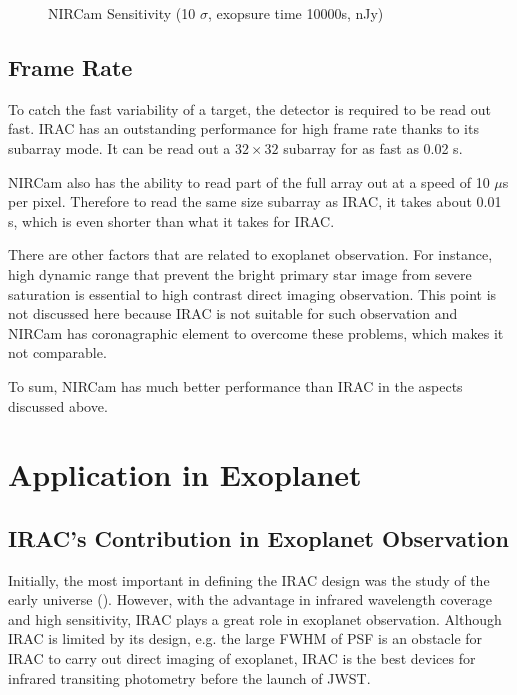 \documentclass[preprint, 12pt]{aastex} \synctex=1
\begin{document}
\begin{figure} \centering {}
  \caption{NIRCam Sensitivity (10 $\sigma$, exopsure time 10000s,
nJy)}
  \label{fig:nircam-sen}
\end{figure}

\subsection{Frame Rate} To catch the fast variability of a target, the
detector is required to be read out fast. IRAC has an outstanding
performance for high frame rate thanks to its subarray mode. It can be
read out a $32 \times 32$ subarray for as fast as 0.02 s.

NIRCam also has the ability to read part of the full array out at a
speed of 10 $\mu$s per pixel. Therefore to read the same size subarray
as IRAC, it takes about 0.01 s, which is even shorter than what it
takes for IRAC.

There are other factors that are related to exoplanet observation. For
instance, high dynamic range that prevent the bright primary star
image from severe saturation is essential to high contrast direct
imaging observation. This point is not discussed here because IRAC is
not suitable for such observation and NIRCam has coronagraphic element
to overcome these problems, which makes it not comparable.

To sum, NIRCam has much better performance than IRAC in the aspects
discussed above.

\section{Application in Exoplanet}
\subsection{IRAC's Contribution in Exoplanet Observation} Initially,
the most important in defining the IRAC design was the study of the
early universe (\citep{2004ApJS..154...10F}). However, with the
advantage in infrared wavelength coverage and high sensitivity, IRAC
plays a great role in exoplanet observation. Although IRAC is limited
by its design, e.g. the large FWHM of PSF is an obstacle for IRAC to
carry out direct imaging of exoplanet, IRAC is the best devices for
infrared transiting photometry before the launch of JWST. \par
\end{document}
